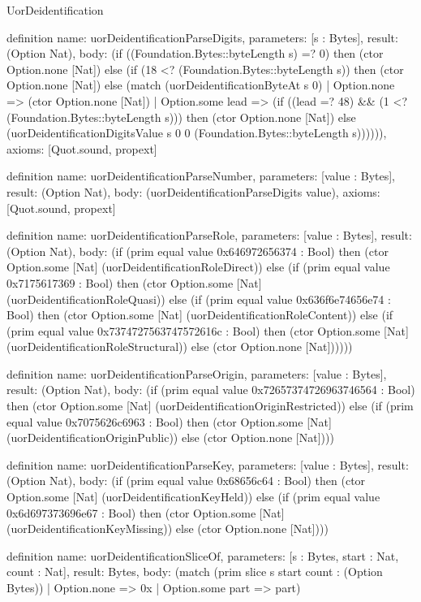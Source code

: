 \begin{lexlean}{UorDeidentification}
\begin{semanticmodule}
definition{
  name: uorDeidentificationParseDigits,
  parameters: [s : Bytes],
  result: (Option Nat),
  body: (if ((Foundation.Bytes::byteLength s) =? 0) then (ctor Option.none [Nat]) else (if (18 <? (Foundation.Bytes::byteLength s)) then (ctor Option.none [Nat]) else (match (uorDeidentificationByteAt s 0)
    | Option.none => (ctor Option.none [Nat])
    | Option.some lead => (if ((lead =? 48) && (1 <? (Foundation.Bytes::byteLength s))) then (ctor Option.none [Nat]) else (uorDeidentificationDigitsValue s 0 0 (Foundation.Bytes::byteLength s)))))),
  axioms: [Quot.sound, propext]
}

definition{
  name: uorDeidentificationParseNumber,
  parameters: [value : Bytes],
  result: (Option Nat),
  body: (uorDeidentificationParseDigits value),
  axioms: [Quot.sound, propext]
}

definition{
  name: uorDeidentificationParseRole,
  parameters: [value : Bytes],
  result: (Option Nat),
  body: (if (prim equal value 0x646972656374 : Bool) then (ctor Option.some [Nat] (uorDeidentificationRoleDirect)) else (if (prim equal value 0x7175617369 : Bool) then (ctor Option.some [Nat] (uorDeidentificationRoleQuasi)) else (if (prim equal value 0x636f6e74656e74 : Bool) then (ctor Option.some [Nat] (uorDeidentificationRoleContent)) else (if (prim equal value 0x7374727563747572616c : Bool) then (ctor Option.some [Nat] (uorDeidentificationRoleStructural)) else (ctor Option.none [Nat])))))
}

definition{
  name: uorDeidentificationParseOrigin,
  parameters: [value : Bytes],
  result: (Option Nat),
  body: (if (prim equal value 0x72657374726963746564 : Bool) then (ctor Option.some [Nat] (uorDeidentificationOriginRestricted)) else (if (prim equal value 0x7075626c6963 : Bool) then (ctor Option.some [Nat] (uorDeidentificationOriginPublic)) else (ctor Option.none [Nat])))
}

definition{
  name: uorDeidentificationParseKey,
  parameters: [value : Bytes],
  result: (Option Nat),
  body: (if (prim equal value 0x68656c64 : Bool) then (ctor Option.some [Nat] (uorDeidentificationKeyHeld)) else (if (prim equal value 0x6d697373696e67 : Bool) then (ctor Option.some [Nat] (uorDeidentificationKeyMissing)) else (ctor Option.none [Nat])))
}

definition{
  name: uorDeidentificationSliceOf,
  parameters: [s : Bytes, start : Nat, count : Nat],
  result: Bytes,
  body: (match (prim slice s start count : (Option Bytes))
    | Option.none => 0x
    | Option.some part => part)
}


\end{semanticmodule}
\end{lexlean}

